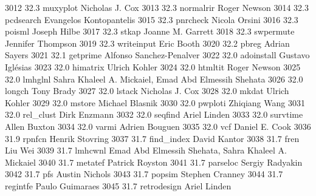   3012     32.3    muxyplot      Nicholas J. Cox                         
  3013     32.3    normalrir     Roger Newson                            
  3014     32.3    pcdsearch     Evangelos Kontopantelis                 
  3015     32.3    pnrcheck      Nicola Orsini                           
  3016     32.3    poisml        Joseph Hilbe                            
  3017     32.3    stkap         Joanne M. Garrett                       
  3018     32.3    swpermute     Jennifer Thompson                       
  3019     32.3    writeinput    Eric Booth                              
  3020     32.2    pbreg         Adrian Sayers                           
  3021     32.1    getprime      Alfonso Sanchez-Penalver                
  3022     32.0    adoinstall    Gustavo Iglésias                       
  3023     32.0    himatrix      Ulrich Kohler                           
  3024     32.0    htmltit       Roger Newson                            
  3025     32.0    lmhglnl       Sahra Khaleel A. Mickaiel, Emad Abd     
                                   Elmessih Shehata                        
  3026     32.0    longch        Tony Brady                              
  3027     32.0    lstack        Nicholas J. Cox                         
  3028     32.0    mkdat         Ulrich Kohler                           
  3029     32.0    mstore        Michael Blasnik                         
  3030     32.0    pwploti       Zhiqiang Wang                           
  3031     32.0    rel_clust     Dirk Enzmann                            
  3032     32.0    seqfind       Ariel Linden                            
  3033     32.0    survtime      Allen Buxton                            
  3034     32.0    varmi         Adrien Bouguen                          
  3035     32.0    vcf           Daniel E. Cook                          
  3036     31.9    rpnfcn        Henrik Stovring                         
  3037     31.7    find_index    David Kantor                            
  3038     31.7    fren          Liu Wei                                 
  3039     31.7    lmhcwnl       Emad Abd Elmessih Shehata, Sahra        
                                   Khaleel A. Mickaiel                     
  3040     31.7    metatef       Patrick Royston                         
  3041     31.7    parseloc      Sergiy Radyakin                         
  3042     31.7    pfs           Austin Nichols                          
  3043     31.7    popsim        Stephen Cranney                         
  3044     31.7    regintfe      Paulo Guimaraes                         
  3045     31.7    retrodesign   Ariel Linden                            
